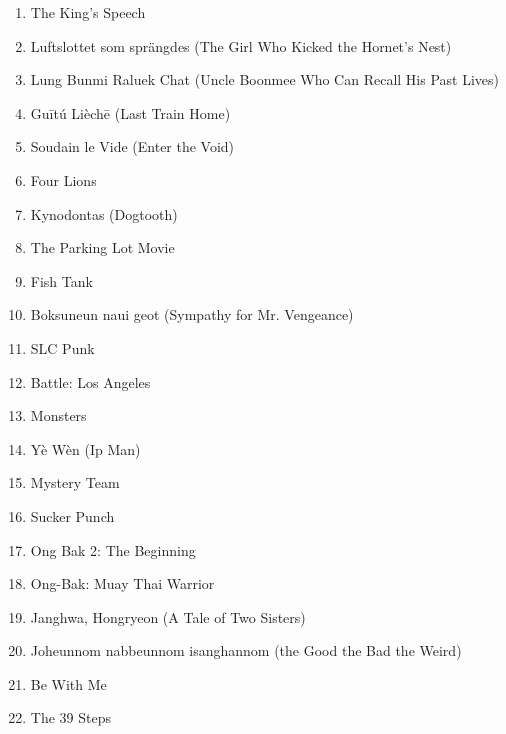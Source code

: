 \documentclass[11pt]{article}
\begin{document}
\begin{enumerate}
\item The King's Speech
\item Luftslottet som sprängdes (The Girl Who Kicked the Hornet's Nest)
\item Lung Bunmi Raluek Chat (Uncle Boonmee Who Can Recall His Past Lives)
\item Guītú Lièchē (Last Train Home)
\item Soudain le Vide (Enter the Void)
\item Four Lions
\item Kynodontas (Dogtooth)
\item The Parking Lot Movie
\item Fish Tank
\item Boksuneun naui geot (Sympathy for Mr. Vengeance)
\item SLC Punk
\item Battle: Los Angeles
\item Monsters
\item Yè Wèn (Ip Man)
\item Mystery Team
\item Sucker Punch
\item Ong Bak 2: The Beginning 
\item Ong-Bak: Muay Thai Warrior
\item Janghwa, Hongryeon (A Tale of Two Sisters)
\item Joheunnom nabbeunnom isanghannom (the Good the Bad the Weird)
\item Be With Me
\item The 39 Steps
\end{enumerate}
\end{document}
